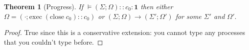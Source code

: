 \documentclass[11pt]{article}
\theoremstyle{plain}
\newtheorem{thm}{Theorem}[section]
\theoremstyle{definition}
\theoremstyle{remark}
\newcommand\terminate{\mathbf{1}}
\newcommand\close[1]{\mathrm{close}\;#1}
\newcommand\typeProc[3]{#1 :: #2 : #3}
\newcommand\state[2]{(#1 \mathrel{;} #2)}
\newcommand\steps[4]{\state{#1}{#2} \longrightarrow \state{#3}{#4}}
\newcommand\execC[2]{\mathrm{exec}\;{#1} :: {#2}}
\newcommand\valid[4]{\models \typeProc{\state{#1}{#2}}{#3}{#4}}
\begin{document}
\begin{thm}[Progress]
If $\valid{\Sigma}{\Omega}{c_0}{\terminate}$ then either $\Omega = \state{\cdot}{\execC{(\close{c_0})}{c_0}}$ or $\steps{\Sigma}{\Omega}{\Sigma'}{\Omega'}$ for some $\Sigma'$ and $\Omega'.$
\end{thm}

\begin{proof}
True since this is a conservative extension: you cannot type any processes that you couldn't type before.
\end{proof}
\end{document}
